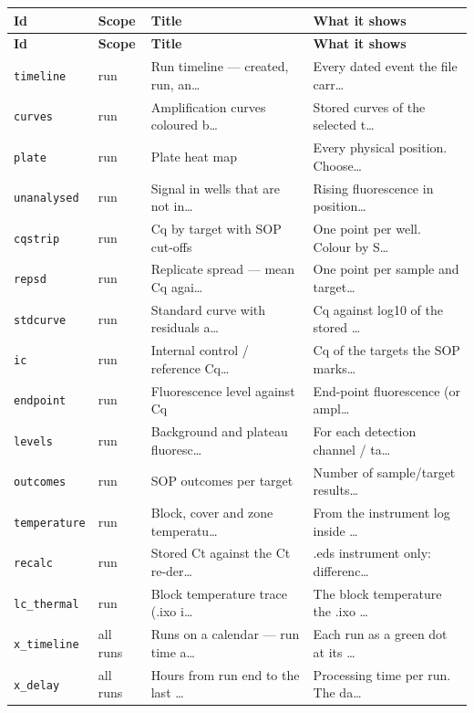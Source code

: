 {\footnotesize
\begin{longtable}{@{}llll@{}}
\toprule \textbf{Id} & \textbf{Scope} & \textbf{Title} & \textbf{What it shows} \\\midrule\endfirsthead
\toprule \textbf{Id} & \textbf{Scope} & \textbf{Title} & \textbf{What it shows} \\\midrule\endhead
\texttt{timeline} & run & Run timeline — created, run, an… & Every dated event the file carr… \\\hline
\texttt{curves} & run & Amplification curves coloured b… & Stored curves of the selected t… \\\hline
\texttt{plate} & run & Plate heat map & Every physical position. Choose… \\\hline
\texttt{unanalysed} & run & Signal in wells that are not in… & Rising fluorescence in position… \\\hline
\texttt{cqstrip} & run & Cq by target with SOP cut-offs & One point per well. Colour by S… \\\hline
\texttt{repsd} & run & Replicate spread — mean Cq agai… & One point per sample and target… \\\hline
\texttt{stdcurve} & run & Standard curve with residuals a… & Cq against log10 of the stored … \\\hline
\texttt{ic} & run & Internal control / reference Cq… & Cq of the targets the SOP marks… \\\hline
\texttt{endpoint} & run & Fluorescence level against Cq & End-point fluorescence (or ampl… \\\hline
\texttt{levels} & run & Background and plateau fluoresc… & For each detection channel / ta… \\\hline
\texttt{outcomes} & run & SOP outcomes per target & Number of sample/target results… \\\hline
\texttt{temperature} & run & Block, cover and zone temperatu… & From the instrument log inside … \\\hline
\texttt{recalc} & run & Stored Ct against the Ct re-der… & .eds instrument only: differenc… \\\hline
\texttt{lc\_thermal} & run & Block temperature trace (.ixo i… & The block temperature the .ixo … \\\hline
\texttt{x\_timeline} & all runs & Runs on a calendar — run time a… & Each run as a green dot at its … \\\hline
\texttt{x\_delay} & all runs & Hours from run end to the last … & Processing time per run. The da… \\\hline

\end{longtable}}
